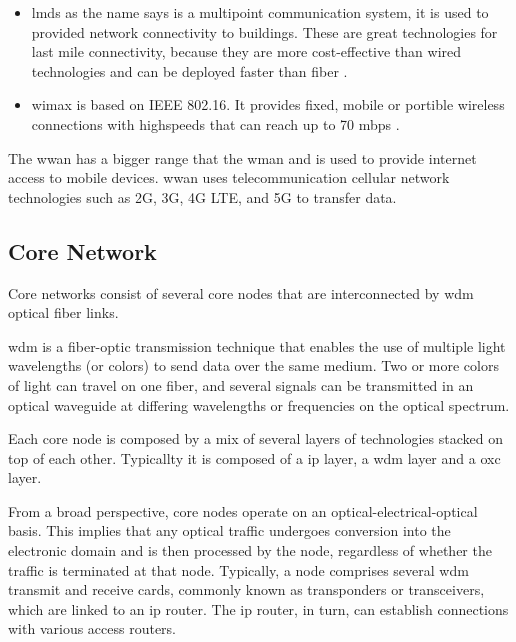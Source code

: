 \begin{itemize}

    \item \ac{lmds} as the name says is a multipoint communication system, it is used to provided network connectivity to buildings. These are great technologies for last mile connectivity, because they are more cost-effective than wired technologies and can be deployed faster than fiber \cite{forum:imda}.

    \item \ac{wimax}  is based on IEEE 802.16. It provides fixed, mobile or portible wireless connections with highspeeds that can reach up to 70 \ac{mbps} \cite{forum:ctrfantennasinc}.

\end{itemize}

The \ac{wwan} has a bigger range that the \ac{wman} and is used to provide internet access to mobile devices.
\ac{wwan} uses telecommunication cellular network technologies such as 2G, 3G, 4G LTE, and 5G to transfer data.


\subsection{Core Network}

Core networks consist of several core nodes that are interconnected by \ac{wdm} optical fiber links.

\ac{wdm} is a fiber-optic transmission technique that enables the use of multiple light wavelengths (or colors) to send data over the same medium. Two or more colors of light can travel on one fiber, and several signals can be transmitted in an optical waveguide at differing wavelengths or frequencies on the optical spectrum. 

Each core node is composed by a mix of several layers of technologies stacked on top of each other. Typicallty it is composed of a \ac{ip} layer, a \ac{wdm} layer and a \ac{oxc} layer.

From a broad perspective, core nodes operate on an optical-electrical-optical basis. This implies that any optical traffic undergoes conversion into the electronic domain and is then processed by the node, regardless of whether the traffic is terminated at that node. Typically, a node comprises several \ac{wdm} transmit and receive cards, commonly known as transponders or transceivers, which are linked to an \ac{ip} router. The \ac{ip} router, in turn, can establish connections with various access routers.

